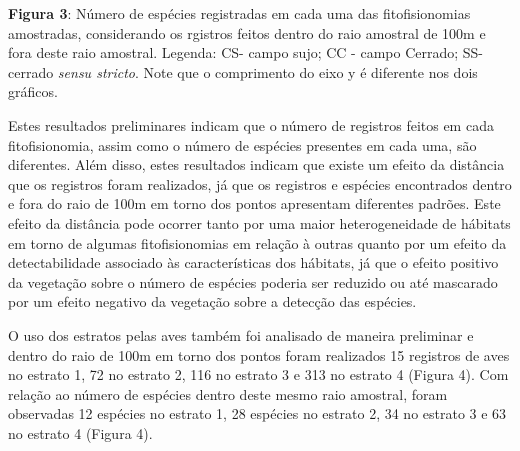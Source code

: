 \textbf{Figura 3}: Número de espécies registradas em cada uma das fitofisionomias amostradas, considerando os rgistros feitos dentro do raio amostral de 100m e fora deste raio amostral. Legenda: CS- campo sujo; CC -  campo Cerrado; SS- cerrado \textit{sensu stricto}. Note que o comprimento do eixo y é diferente nos dois gráficos.

Estes resultados preliminares indicam que o número de registros feitos em cada fitofisionomia, assim como o número de espécies presentes em cada uma, são diferentes. Além disso, estes resultados indicam que existe um efeito da distância que os registros foram realizados, já que os registros e espécies encontrados dentro e fora do raio de 100m em torno dos pontos apresentam diferentes padrões. Este efeito da distância pode ocorrer tanto por uma maior heterogeneidade de hábitats em torno de algumas fitofisionomias em relação à outras quanto por um efeito da detectabilidade associado às características dos hábitats, já que o efeito positivo da vegetação sobre o número de espécies poderia ser reduzido ou até mascarado por um efeito negativo da vegetação sobre a detecção das espécies.

O uso dos estratos pelas aves também foi analisado de maneira preliminar e dentro do raio de 100m em torno dos pontos foram realizados 15 registros de aves no estrato 1, 72 no estrato 2, 116 no estrato 3 e 313 no estrato 4 (Figura 4). Com relação ao número de espécies dentro deste mesmo raio amostral, foram observadas 12 espécies no estrato 1, 28 espécies no estrato 2, 34 no estrato 3 e 63 no estrato 4 (Figura 4).